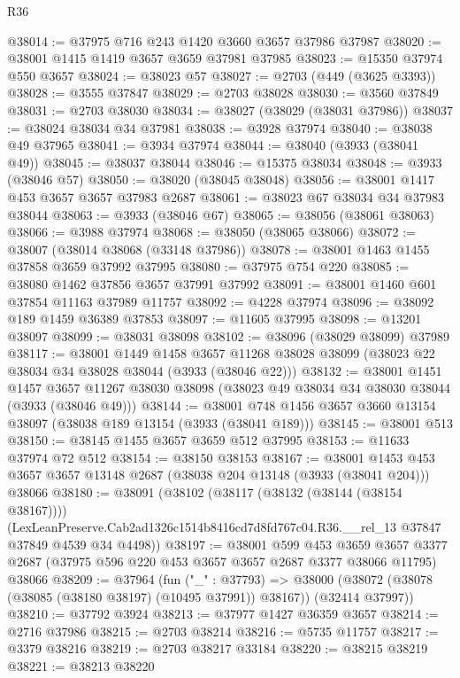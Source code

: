 \begin{lexlean}{R36}
\begin{coremodule}
@38014 := @37975 @716 @243 @1420 @3660 @3657 @37986 @37987
@38020 := @38001 @1415 @1419 @3657 @3659 @37981 @37985
@38023 := @15350 @37974 @550 @3657
@38024 := @38023 @57
@38027 := @2703 (@449 (@3625 @3393))
@38028 := @3555 @37847
@38029 := @2703 @38028
@38030 := @3560 @37849
@38031 := @2703 @38030
@38034 := @38027 (@38029 (@38031 @37986))
@38037 := @38024 @38034 @34 @37981
@38038 := @3928 @37974
@38040 := @38038 @49 @37965
@38041 := @3934 @37974
@38044 := @38040 (@3933 (@38041 @49))
@38045 := @38037 @38044
@38046 := @15375 @38034
@38048 := @3933 (@38046 @57)
@38050 := @38020 (@38045 @38048)
@38056 := @38001 @1417 @453 @3657 @3657 @37983 @2687
@38061 := @38023 @67 @38034 @34 @37983 @38044
@38063 := @3933 (@38046 @67)
@38065 := @38056 (@38061 @38063)
@38066 := @3988 @37974
@38068 := @38050 (@38065 @38066)
@38072 := @38007 (@38014 @38068 (@33148 @37986))
@38078 := @38001 @1463 @1455 @37858 @3659 @37992 @37995
@38080 := @37975 @754 @220
@38085 := @38080 @1462 @37856 @3657 @37991 @37992
@38091 := @38001 @1460 @601 @37854 @11163 @37989 @11757
@38092 := @4228 @37974
@38096 := @38092 @189 @1459 @36389 @37853
@38097 := @11605 @37995
@38098 := @13201 @38097
@38099 := @38031 @38098
@38102 := @38096 (@38029 @38099) @37989
@38117 := @38001
    @1449
    @1458
    @3657
    @11268
    @38028
    @38099
    (@38023 @22 @38034 @34 @38028 @38044 (@3933 (@38046 @22)))
@38132 := @38001
    @1451
    @1457
    @3657
    @11267
    @38030
    @38098
    (@38023 @49 @38034 @34 @38030 @38044 (@3933 (@38046 @49)))
@38144 := @38001 @748 @1456 @3657 @3660 @13154 @38097 (@38038 @189 @13154 (@3933 (@38041 @189)))
@38145 := @38001 @513
@38150 := @38145 @1455 @3657 @3659 @512 @37995
@38153 := @11633 @37974 @72 @512
@38154 := @38150 @38153
@38167 := @38001
    @1453
    @453
    @3657
    @3657
    @13148
    @2687
    (@38038 @204 @13148 (@3933 (@38041 @204)))
    @38066
@38180 := @38091
    (@38102
      (@38117 (@38132 (@38144 (@38154 @38167))))
      (LexLeanPreserve.Cab2ad1326c1514b8416cd7d8fd767c04.R36.__rel_13
        @37847
        @37849
        @4539
        @34
        @4498))
@38197 := @38001
    @599
    @453
    @3659
    @3657
    @3377
    @2687
    (@37975 @596 @220 @453 @3657 @3657 @2687 @3377 @38066 @11795)
    @38066
@38209 := @37964
    (fun ("_" : @37793) =>
    @38000 (@38072 (@38078 (@38085 (@38180 @38197) (@10495 @37991)) @38167)) (@32414 @37997))
@38210 := @37792 @3924
@38213 := @37977 @1427 @36359 @3657
@38214 := @2716 @37986
@38215 := @2703 @38214
@38216 := @5735 @11757
@38217 := @3379 @38216
@38219 := @2703 @38217 @33184
@38220 := @38215 @38219
@38221 := @38213 @38220

\end{coremodule}
\end{lexlean}
